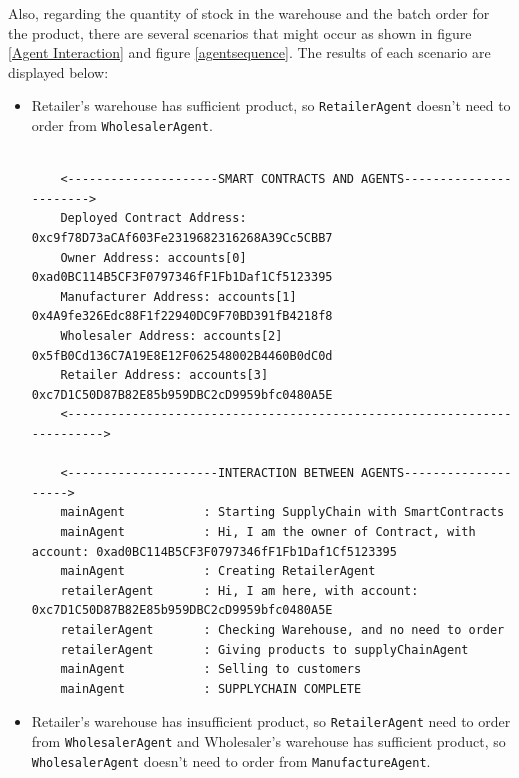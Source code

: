 \vspace{.5cm}

Also, regarding the quantity of stock in the warehouse and the batch order for the product, there are several scenarios that might occur as shown in figure \ref{Agent Interaction} and figure \ref{agentsequence}. The results of each scenario are displayed below:

\vspace{.5cm}

\begin{itemize}
    \item Retailer's warehouse has sufficient product, so \texttt{RetailerAgent} doesn't need to order from \texttt{WholesalerAgent}.

    \vspace{.5cm}
    \begin{lstlisting}[numbers=none, basicstyle=\ttfamily\tiny]
    
    <---------------------SMART CONTRACTS AND AGENTS----------------------->
    Deployed Contract Address: 0xc9f78D73aCAf603Fe2319682316268A39Cc5CBB7
    Owner Address: accounts[0] 0xad0BC114B5CF3F0797346fF1Fb1Daf1Cf5123395
    Manufacturer Address: accounts[1] 0x4A9fe326Edc88F1f22940DC9F70BD391fB4218f8
    Wholesaler Address: accounts[2] 0x5fB0Cd136C7A19E8E12F062548002B4460B0dC0d
    Retailer Address: accounts[3] 0xc7D1C50D87B82E85b959DBC2cD9959bfc0480A5E
    <------------------------------------------------------------------------>
    
    <---------------------INTERACTION BETWEEN AGENTS-------------------->
    mainAgent           : Starting SupplyChain with SmartContracts
    mainAgent           : Hi, I am the owner of Contract, with account: 0xad0BC114B5CF3F0797346fF1Fb1Daf1Cf5123395
    mainAgent           : Creating RetailerAgent
    retailerAgent       : Hi, I am here, with account: 0xc7D1C50D87B82E85b959DBC2cD9959bfc0480A5E
    retailerAgent       : Checking Warehouse, and no need to order
    retailerAgent       : Giving products to supplyChainAgent
    mainAgent           : Selling to customers
    mainAgent           : SUPPLYCHAIN COMPLETE
    \end{lstlisting}
    
    \vspace{.5cm}
    
    \item Retailer's warehouse has insufficient product, so \texttt{RetailerAgent} need to order from \texttt{WholesalerAgent} and Wholesaler's warehouse has sufficient product, so \texttt{WholesalerAgent} doesn't need to order from \texttt{ManufactureAgent}.


\end{itemize}
